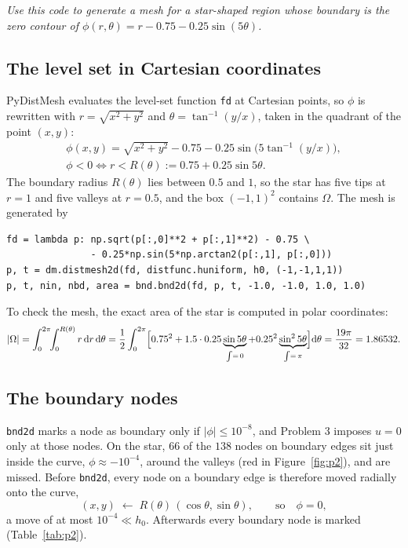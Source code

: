 \documentclass[11pt]{article}
\newcommand{\abs}[1]{\lvert #1\rvert}
\newcommand{\Om}{\Omega}
\begin{document}
\textit{Use this code to generate a mesh for a star-shaped region whose
boundary is the zero contour of $\phi(r,\theta)=r-0.75-0.25\sin(5\theta)$.}

\subsection*{The level set in Cartesian coordinates}

PyDistMesh evaluates the level-set function \texttt{fd} at Cartesian points,
so $\phi$ is rewritten with $r=\sqrt{x^{2}+y^{2}}$ and
$\theta=\tan^{-1}(y/x)$, taken in the quadrant of the point $(x,y)$:
\begin{equation}\label{eq:phi}
  \begin{gathered}
  \phi(x,y)=\sqrt{x^{2}+y^{2}}-0.75-0.25\sin\bigl(5\tan^{-1}(y/x)\bigr),\\
  \phi<0\iff r<R(\theta):=0.75+0.25\sin5\theta .
  \end{gathered}
\end{equation}
The boundary radius $R(\theta)$ lies between $0.5$ and $1$, so the star has
five tips at $r=1$ and five valleys at $r=0.5$, and the box $(-1,1)^{2}$
contains $\Om$.  The mesh is generated by
\begin{Verbatim}[fontsize=\small,xleftmargin=1em]
fd = lambda p: np.sqrt(p[:,0]**2 + p[:,1]**2) - 0.75 \
               - 0.25*np.sin(5*np.arctan2(p[:,1], p[:,0]))
p, t = dm.distmesh2d(fd, distfunc.huniform, h0, (-1,-1,1,1))
p, t, nin, nbd, area = bnd.bnd2d(fd, p, t, -1.0, -1.0, 1.0, 1.0)
\end{Verbatim}
To check the mesh, the exact area of the star is computed in polar
coordinates:
\begin{equation}\label{eq:area}
  \abs{\Om}=\int_{0}^{2\pi}\!\!\int_{0}^{R(\theta)}r\,\mathrm{d}r\,\mathrm{d}\theta
  =\frac12\int_{0}^{2\pi}\Bigl[0.75^{2}+1.5\cdot0.25\underbrace{\sin5\theta}_{\int=\,0}
   +0.25^{2}\underbrace{\sin^{2}5\theta}_{\int=\,\pi}\Bigr]\mathrm{d}\theta
  =\frac{19\pi}{32}=1.86532 .
\end{equation}

\subsection*{The boundary nodes}

\texttt{bnd2d} marks a node as boundary only if $\abs{\phi}\le10^{-8}$, and
Problem 3 imposes $u=0$ only at those nodes.  On the star, $66$ of the $138$
nodes on boundary edges sit just inside the curve, $\phi\approx-10^{-4}$,
around the valleys (red in Figure~\ref{fig:p2}), and are missed.  Before
\texttt{bnd2d}, every node on a boundary edge is therefore moved radially
onto the curve,
\begin{equation}\label{eq:snap}
  (x,y)\;\leftarrow\;R(\theta)\,(\cos\theta,\sin\theta),
  \qquad\text{so}\quad \phi=0 ,
\end{equation}
a move of at most $10^{-4}\ll h_{0}$.  Afterwards every boundary node is
marked (Table~\ref{tab:p2}).
\end{document}
